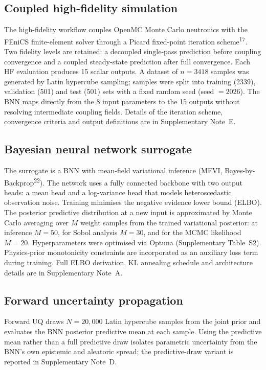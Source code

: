 \documentclass[11pt,a4paper]{article}
\begin{document}
\subsection{Coupled high-fidelity simulation}

The high-fidelity workflow couples OpenMC Monte Carlo neutronics with the
FEniCS finite-element solver through a Picard fixed-point iteration
scheme\textsuperscript{17}. Two fidelity levels are retained: a decoupled
single-pass prediction before coupling convergence and a coupled
steady-state prediction after full convergence. Each HF evaluation
produces 15 scalar outputs. A dataset of $n = 3418$ samples was
generated by Latin hypercube sampling; samples were split into training
(2339), validation (501) and test (501) sets with a fixed random seed
(seed $= 2026$). The BNN maps directly from the 8 input parameters to
the 15 outputs without resolving intermediate coupling fields. Details
of the iteration scheme, convergence criteria and output definitions are
in Supplementary Note~E.

\subsection{Bayesian neural network surrogate}

The surrogate is a BNN with mean-field variational inference (MFVI,
Bayes-by-Backprop\textsuperscript{22}). The network uses a fully
connected backbone with two output heads: a mean head and a log-variance
head that models heteroscedastic observation noise. Training minimises
the negative evidence lower bound (ELBO). The posterior predictive
distribution at a new input is approximated by Monte Carlo averaging
over $M$ weight samples from the trained variational posterior: at
inference $M = 50$, for Sobol analysis $M = 30$, and for the MCMC
likelihood $M = 20$. Hyperparameters were optimised via Optuna
(Supplementary Table~S2). Physics-prior monotonicity constraints are
incorporated as an auxiliary loss term during training. Full ELBO
derivation, KL annealing schedule and architecture details are in
Supplementary Note~A.

\subsection{Forward uncertainty propagation}

Forward UQ draws $N = 20{,}000$ Latin hypercube samples from the joint
prior and evaluates the BNN posterior predictive mean at each sample.
Using the predictive mean rather than a full predictive draw isolates
parametric uncertainty from the BNN's own epistemic and aleatoric spread;
the predictive-draw variant is reported in Supplementary Note~D.
\end{document}
